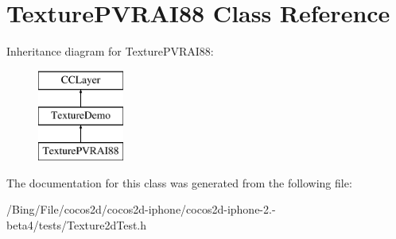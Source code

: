 \hypertarget{interface_texture_p_v_r_a_i88}{\section{Texture\-P\-V\-R\-A\-I88 Class Reference}
\label{interface_texture_p_v_r_a_i88}
}
Inheritance diagram for Texture\-P\-V\-R\-A\-I88\-:\begin{figure}[H]
\begin{center}
\leavevmode
\includegraphics[height=3.000000cm]{interface_texture_p_v_r_a_i88}
\end{center}
\end{figure}


The documentation for this class was generated from the following file\-:\begin{DoxyCompactItemize}
\item 
/\-Bing/\-File/cocos2d/cocos2d-\/iphone/cocos2d-\/iphone-\/2.-\/beta4/tests/Texture2d\-Test.\-h\end{DoxyCompactItemize}
